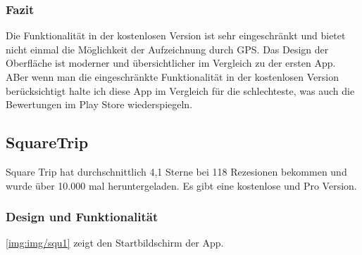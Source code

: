 \documentclass[a4paper]{article}
\begin{document}
\subsubsection{Fazit}
Die Funktionalität in der kostenlosen Version ist sehr eingeschränkt und bietet nicht einmal die
Möglichkeit der Aufzeichnung durch GPS. Das Design der Oberfläche ist moderner und übersichtlicher
im Vergleich zu der ersten App. ABer wenn man die eingeschränkte Funktionalität in der kostenlosen
Version berücksichtigt halte ich diese App im Vergleich für die schlechteste, was auch die Bewertungen
im Play Store wiederspiegeln.

\subsection{SquareTrip}
Square Trip hat durchschnittlich 4,1 Sterne bei 118 Rezesionen bekommen und wurde über 10.000
mal heruntergeladen. Es gibt eine kostenlose und Pro Version.


\subsubsection{Design und Funktionalität}
\ref{img:img/squ1} zeigt den Startbildschirm der App.
\end{document}
